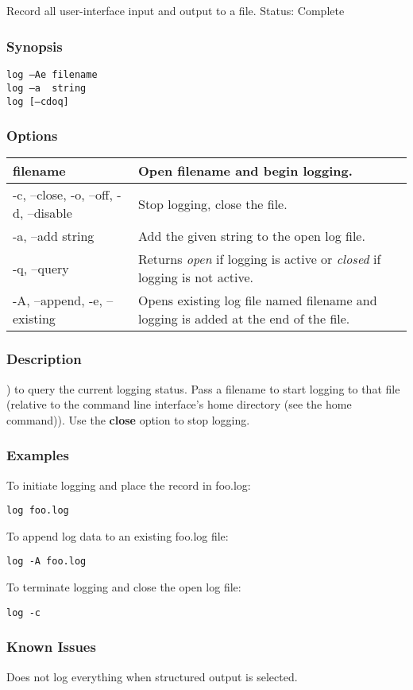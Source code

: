 \subsection{}
\label{log}
Record all user-interface input and output to a file. 
 Status: Complete
\subsubsection*{Synopsis}
\begin{verbatim}
log –Ae filename
log –a  string
log [–cdoq]
\end{verbatim}
\subsubsection*{Options}
\begin{tabular}{|l|l|}
\hline 
 filename  & Open filename and begin logging.  \\
 \hline 
 -c, --close, -o, --off, -d, --disable  & Stop logging, close the file.  \\
 \hline 
 -a, --add string  & Add the given string to the open log file.  \\
 \hline 
 -q, --query  & Returns \emph{open}
 if logging is active or \emph{closed}
 if logging is not active.  \\
 \hline 
 -A, --append, -e, --existing  & Opens existing log file named filename and logging is added at the end of the file.  \\
 \hline 
\end{tabular}
\subsubsection*{Description}
) to query the current logging status. Pass a filename to start logging to that file (relative to the command line interface's home directory (see the home command)). Use the \textbf{close}
 option to stop logging. 
\subsubsection*{Examples}
 To initiate logging and place the record in foo.log: \begin{verbatim}
log foo.log
\end{verbatim}
 To append log data to an existing foo.log file: \begin{verbatim}
log -A foo.log
\end{verbatim}
 To terminate logging and close the open log file: \begin{verbatim}
log -c
\end{verbatim}
\subsubsection*{Known Issues}
 Does not log everything when structured output is selected. 
